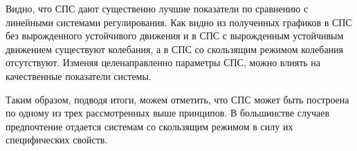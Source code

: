 Видно, что СПС дают существенно лучшие показатели по сравнению с линейными системами регулирования. Как видно из полученных графиков в СПС без вырожденного устойчивого движения и в СПС с вырожденным устойчивым движением существуют колебания, а в СПС со скользящим режимом колебания отсутствуют. Изменяя целенаправленно параметры СПС, можно влиять на качественные показатели системы. 

Таким образом, подводя итоги, можем отметить, что СПС может быть построена по одному из трех рассмотренных выше принципов. В большинстве случаев предпочтение отдается системам со скользящим режимом в силу их специфических свойств.
